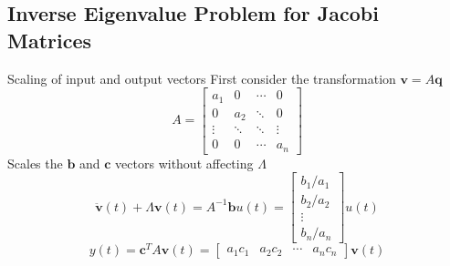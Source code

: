 \documentclass{beamer}
\begin{document}
\subsection{Inverse Eigenvalue Problem for Jacobi Matrices}
\begin{frame}{Scaling of input and output vectors}
First consider the transformation $\mathbf{v} = A \mathbf{q}$
$$A = \begin{bmatrix}
a_1  &  0 & \cdots & 0 \\
0 & a_2  & \ddots & 0 \\
\vdots & \ddots & \ddots & \vdots \\
0 & 0 & \cdots & a_n \end{bmatrix}$$
Scales the $\mathbf{b}$ and $\mathbf{c}$ vectors without affecting $\Lambda$
\begin{equation}
\ddot{\mathbf{v}}(t) +  \Lambda \mathbf{v}(t) =  A^{-1} \mathbf{b}u(t) =  \begin{bmatrix} b_1/a_1 \\ b_2/a_2 \\ \vdots \\ b_n/a_n  \end{bmatrix} u(t)
\label{eq:scaled1}
\end{equation}
\begin{equation}
y(t) = \mathbf{c}^T  A \mathbf{v}(t) = \begin{bmatrix} a_1 c_1 & a_2 c_2 & \cdots & a_n c_n \end{bmatrix} \mathbf{v}(t)
\label{eq:scaled2}
\end{equation}
\end{frame}
\end{document}
